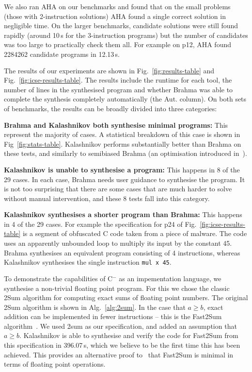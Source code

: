 \documentclass[a4paper]{llncs}
\newcommand{\newC}{C$^-$\xspace}
\begin{document}
We also ran {\sc AHA} on our benchmarks and found that on the small problems (those with 2-instruction solutions)
{\sc AHA} found a single correct solution in negligible time.  On the larger benchmarks, candidate solutions
were still found rapidly (around 10\,s for the 3-instruction programs) but the number of candidates was
too large to practically check them all.  For example on p12, {\sc AHA} found 2284262 candidate
programs in 12.13\,s.

The results of our experiments are shown in Fig.~\ref{fig:results-table} and Fig.~\ref{fig:icse-results-table}.
The results include the runtime for each tool, the number of lines in the synthesised program and whether
{\sc Brahma} was able to complete the synthesis completely automatically (the Aut. column).
On both sets of benchmarks, the results can be broadly divided into three categories:

{\bf {\sc Brahma} and {\sc Kalashnikov} both synthesise minimal programs:}
This represent the majority of cases.  A statistical breakdown of this case is shown in Fig~\ref{fig:stats-table}.
{\sc Kalashnikov} performs substantially better than {\sc Brahma} on these tests, and similarly to
semibiased {\sc Brahma} (an optimisation introduced in~\cite{brahma-icse}).

{\bf {\sc Kalashnikov} is unable to synthesise a program:}
This happens in 8 of the 29 cases.  In each case, {\sc Brahma} needs user guidance to synthesise the program.
It is not too surprising that there are some cases that are much harder to solve without manual
intervention, and these 8 tests fall into this category.

{\bf {\sc Kalashnikov} synthesises a shorter program than {\sc Brahma}:}
This happens in 4 of the 29 cases.  For example the specification for p24 of Fig.~\ref{fig:icse-results-table} 
is a segment of obfuscated C code taken from a piece of malware.  The code uses an apparently unbounded loop
to multiply its input by the constant 45.  {\sc Brahma} synthesises an equivalent program consisting of
4 instructions, whereas {\sc Kalashnikov} synthesises the single instruction \texttt{mul x 45}.

To demonstrate the capabilities of \newC as an impementation language, we synthesise a
non-trivial floating point program.  For this we chose the classic {\sc 2Sum} algorithm for computing
exact sums of floating point numbers.  The original {\sc 2Sum} algorithm is shown in Alg.~\ref{alg:2sum}.
In the case that $a \ge b$, exact addition can be implemented in fewer instructions -- this is the
{\sc Fast2Sum} algorithm~\cite{fast2sum}.  We used {\sc 2sum} as our specification, and
added an assumption that $a \ge b$.  {\sc Kalashnikov} is able to synthesise and verify the
code for {\sc Fast2Sum} from this specification in 396.07\,s, which we believe to be the first time
this has been achieved.  This provides an alternative proof to~\cite{fast2sum} that {\sc Fast2Sum} is
minimal in terms of floating point operations.
\end{document}
